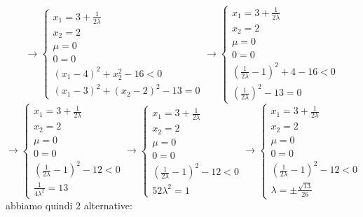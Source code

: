 \documentclass[a4paper,12pt, oneside]{book}
\begin{document}
\[\to
  \begin{cases}
    x_1=3+\frac{1}{2\lambda}\\
    x_2=2\\
    \mu=0\\
    0=0\\
    (x_1-4)^2+x_2^2-16 < 0\\
    (x_1-3)^2+(x_2-2)^2-13=0
  \end{cases}\to\begin{cases}
    x_1=3+\frac{1}{2\lambda}\\
    x_2=2\\
    \mu=0\\
    0=0\\
    (\frac{1}{2\lambda}-1)^2+4-16 < 0\\
    (\frac{1}{2\lambda})^2-13=0
  \end{cases}
\]
\[\to
  \begin{cases}
    x_1=3+\frac{1}{2\lambda}\\
    x_2=2\\
    \mu=0\\
    0=0\\
    (\frac{1}{2\lambda}-1)^2-12 < 0\\
    \frac{1}{4\lambda^2}=13
  \end{cases}\to\begin{cases}
    x_1=3+\frac{1}{2\lambda}\\
    x_2=2\\
    \mu=0\\
    0=0\\
    (\frac{1}{2\lambda}-1)^2-12 < 0\\
    52\lambda^2=1
  \end{cases}\to\begin{cases}
    x_1=3+\frac{1}{2\lambda}\\
    x_2=2\\
    \mu=0\\
    0=0\\
    (\frac{1}{2\lambda}-1)^2-12 < 0\\
    \lambda =\pm \frac{\sqrt{13}}{26}
  \end{cases}
\]
abbiamo quindi 2 alternative:
\end{document}
